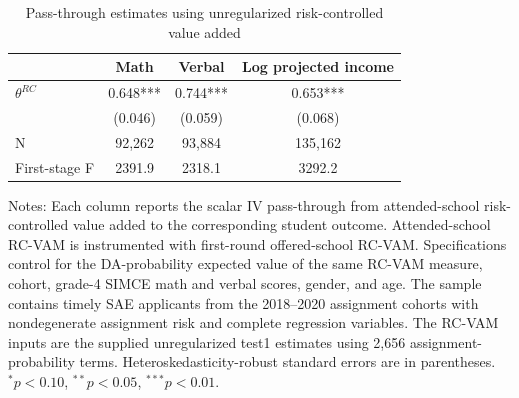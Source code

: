 \begin{table}[!htbp]
\centering
\caption{Pass-through estimates using unregularized risk-controlled value added}
\label{tab:rc-vam-main-theta-test1}
\begin{threeparttable}
\begin{tabular}{lccc}
\toprule
 & Math & Verbal & Log projected income \\
\midrule
$\theta^{RC}$ & 0.648*** & 0.744*** & 0.653*** \\
 & (0.046) & (0.059) & (0.068) \\
N &  92,262 &  93,884 & 135,162 \\
First-stage F & 2391.9 & 2318.1 & 3292.2 \\
\bottomrule
\end{tabular}
\begin{tablenotes}[flushleft]
\footnotesize
\item Notes: Each column reports the scalar IV pass-through from attended-school risk-controlled value added to the corresponding student outcome. Attended-school RC-VAM is instrumented with first-round offered-school RC-VAM. Specifications control for the DA-probability expected value of the same RC-VAM measure, cohort, grade-4 SIMCE math and verbal scores, gender, and age. The sample contains timely SAE applicants from the 2018--2020 assignment cohorts with nondegenerate assignment risk and complete regression variables. The RC-VAM inputs are the supplied unregularized test1 estimates using 2,656 assignment-probability terms. Heteroskedasticity-robust standard errors are in parentheses. $^{*}p<0.10$, $^{**}p<0.05$, $^{***}p<0.01$.
\end{tablenotes}
\end{threeparttable}
\end{table}
